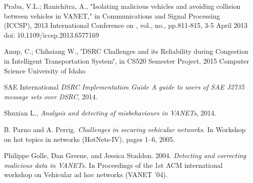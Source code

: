 \documentclass[conference]{IEEEtran}
\begin{document}
\begin{thebibliography}{1}
Praba, V.L.; Ranichitra, A., "Isolating malicious vehicles and avoiding collision between vehicles in VANET," in Communications and Signal Processing (ICCSP), 2013 International Conference on , vol., no., pp.811-815, 3-5 April 2013
doi: 10.1109/iccsp.2013.6577169

	Anup, C.; Chihsiang W., \''DSRC Challenges and its Reliability during Congestion in Intelligent Transportation System\'', in CS520 Semester Project, 2015 Computer Science University of Idaho

	SAE International {\em DSRC Implementation Guide A guide to users of SAE J2735 message sets over DSRC}, 2014.

	Shuxian L., {\em Analysis and detecting of misbehaviours in VANETs}, 2014.

B. Parno and A. Perrig. {\em Challenges in securing vehicular networks}. In Workshop
on hot topics in networks (HotNets-IV), pages 1–6, 2005.

Philippe Golle, Dan Greene, and Jessica Staddon. 2004. {\em Detecting and correcting malicious data in VANETs.} In Proceedings of the 1st ACM international workshop on Vehicular ad hoc networks (VANET '04).
\end{thebibliography}




\end{document}
